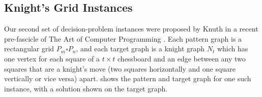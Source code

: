 
\FloatBarrier

\subsection{Knight's Grid Instances}\label{subsec:si-knights-experiment}

Our second set of decision-problem instances were proposed by Knuth in a recent pre-fascicle
of The Art of Computer Programming \citep{knuth2022art}.  Each pattern graph is a rectangular grid
$P_m \square P_n$, and each target graph is a knight graph $N_t$ which has one vertex for each
square of a $t \times t$ chessboard and an edge between any two squares that are a knight's
move (two squares horizontally and one square vertically or vice versa) apart.
 shows the pattern and target graph for one such instance,
with a solution shown on the target graph.

